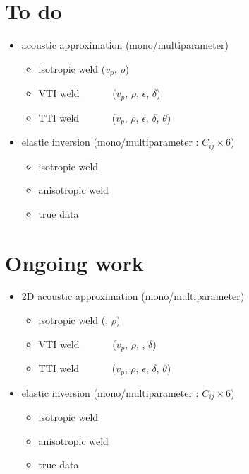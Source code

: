 \documentclass[11pt,xcolor=x11names,compress, notes=show]{beamer}%
\begin{document}
\section{To do}
\begin{frame}{\insertsectionhead}
	\begin{itemize}
		\item <1-> acoustic approximation (mono/multiparameter)
		\begin{itemize}
			\item isotropic weld ($v_{p}$, $\rho$)
			\item VTI weld	~~~~~~($v_{p}$, $\rho$, $\epsilon$, $\delta$)
			\item TTI weld	~~~~~~($v_{p}$, $\rho$, $\epsilon$, $\delta$, $\theta$)
		\end{itemize}
		\item <2-> elastic inversion (mono/multiparameter : $C_{ij}\times$6)
		\begin{itemize}
			\item isotropic weld
			\item anisotropic weld
			\item true data
		\end{itemize}		
	\end{itemize}
\end{frame}

\section{Ongoing work}
\begin{frame}{\insertsectionhead}
	\begin{itemize}
		\item <1-> 2D acoustic approximation (mono/multiparameter)
		\begin{itemize}
			\item isotropic weld (, $\rho$)
			\item VTI weld	~~~~~~($v_{p}$, $\rho$, , $\delta$)
			\item TTI weld	~~~~~~($v_{p}$, $\rho$, $\epsilon$, $\delta$, $\theta$)
		\end{itemize}
		\item <2-> elastic inversion (mono/multiparameter : $C_{ij}\times$6)
		\begin{itemize}
			\item isotropic weld
			\item anisotropic weld
			\item true data
		\end{itemize}		
	\end{itemize}
\end{frame}
\end{document}
